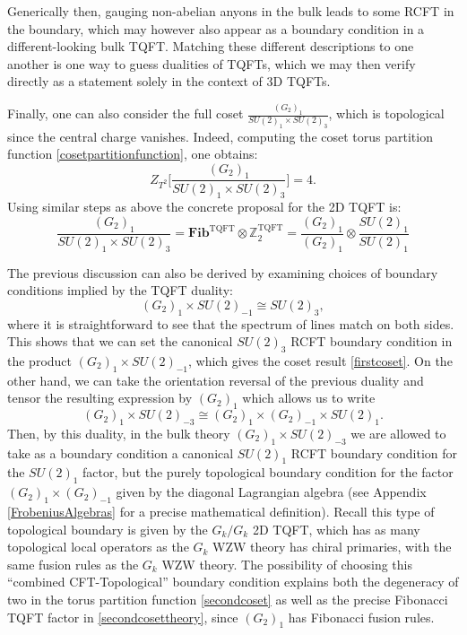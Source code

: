 \documentclass[11pt]{article}
\numberwithin{equation}{section}
\begin{document}
Generically then, gauging non-abelian anyons in the bulk leads to some RCFT in the boundary, which may however also appear as a boundary condition in a different-looking bulk TQFT. Matching these different descriptions to one another is one way to guess dualities of TQFTs, which we may then verify directly as a statement solely in the context of 3D TQFTs.

Finally, one can also consider the full coset $\frac{(G_{2})_{1}}{SU(2)_{1} \times SU(2)_{3}}$, which is topological since the central charge vanishes. Indeed, computing the coset torus partition function \eqref{cosetpartitionfunction}, one obtains:
\begin{equation} \label{thirdcoset}
    Z_{T^{2}}\bigg[\frac{(G_{2})_{1}}{SU(2)_{1} \times SU(2)_{3}}\bigg] = 4.
\end{equation}
 Using similar steps as above the concrete proposal for the 2D TQFT is:
\begin{equation}
\frac{(G_{2})_{1}}{SU(2)_{1} \times SU(2)_{3}} = \mathbf{Fib}^{\mathrm{TQFT}} \otimes \mathbb{Z}_{2}^{\mathrm{TQFT}}= \frac{(G_{2})_{1}}{(G_{2})_{1}} \otimes \frac{SU(2)_{1}}{SU(2)_{1}} \label{thirdcosettheory}
\end{equation}


The previous discussion can also be derived by examining choices of boundary conditions implied by the TQFT duality:
\begin{equation} \label{Levelrank1}
    (G_{2})_{1} \times SU(2)_{-1} \cong SU(2)_{3},
\end{equation}
where it is straightforward to see that the spectrum of lines match on both sides. This shows that we can set the canonical $SU(2)_{3}$ RCFT boundary condition in the product $(G_{2})_{1} \times SU(2)_{-1}$, which gives the coset result \eqref{firstcoset}. On the other hand, we can take the orientation reversal of the previous duality and tensor the resulting expression by $(G_{2})_{1}$ which allows us to write
\begin{equation} \label{levelrank2}
    (G_{2})_{1} \times SU(2)_{-3} \cong (G_{2})_{1} \times (G_{2})_{-1} \times SU(2)_{1}.
\end{equation}
Then, by this duality, in the bulk theory $(G_{2})_{1} \times SU(2)_{-3}$ we are allowed to take as a boundary condition a canonical $SU(2)_{1}$ RCFT boundary condition for the $SU(2)_{1}$ factor, but the purely topological boundary condition for the factor $(G_{2})_{1} \times (G_{2})_{-1}$ given by the diagonal Lagrangian algebra (see Appendix \ref{FrobeniusAlgebras} for a precise mathematical definition). Recall this type of topological boundary is given by the $G_{k}/G_{k}$ 2D TQFT, which has as many topological local operators as the $G_{k}$ WZW theory has chiral primaries, with the same fusion rules as the $G_{k}$ WZW theory. The possibility of choosing this ``combined CFT-Topological'' boundary condition explains both the degeneracy of two in the torus partition function \eqref{secondcoset} as well as the precise Fibonacci TQFT factor in \eqref{secondcosettheory}, since $(G_{2})_{1}$ has Fibonacci fusion rules.
\end{document}
